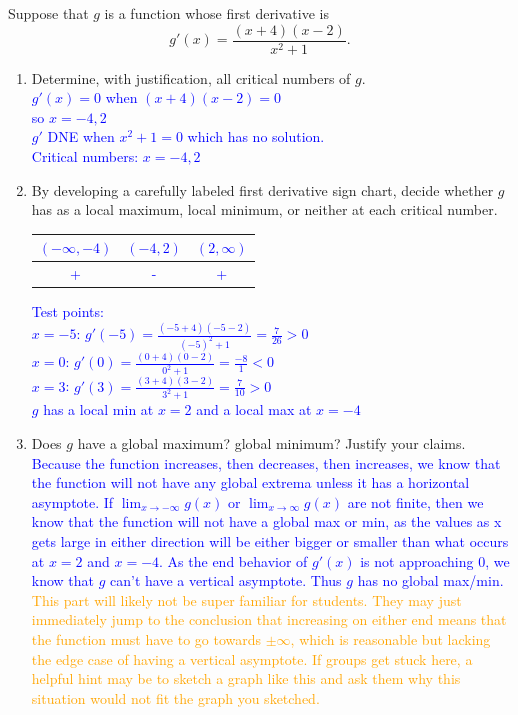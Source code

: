 \documentclass{ximera}
\begin{document}
\begin{exercise}
    Suppose that $g$ is a function whose first derivative is \[g'(x)=\frac{(x+4)(x-2)}{x^2+1}.\]
    \begin{enumerate}
        \item Determine, with justification, all critical numbers of $g$.\\
        \textcolor{blue}{$g'(x)=0$ when $(x+4)(x-2)=0$\\
        so $x=-4, 2$\\
        $g'$ DNE when $x^2+1=0$ which has no solution.\\
        Critical numbers: $x=-4,2$}
        \item  By developing a carefully labeled first derivative sign chart, decide whether $g$ has as a local maximum, local minimum, or neither at each critical number.\\
        \textcolor{blue}{
            \begin{tabular}{c|c|c}
                $(-\infty,-4)$ & $(-4,2)$ & $(2,\infty)$\\
                \hline
                + & - & +\\
            \end{tabular}
        Test points: \\
        $x=-5$: $g'(-5)=\frac{(-5+4)(-5-2)}{(-5)^2+1}=\frac{7}{26}>0$\\
        $x=0$: $g'(0)=\frac{(0+4)(0-2)}{0^2+1}=\frac{-8}{1}<0$\\
        $x=3$: $g'(3)=\frac{(3+4)(3-2)}{3^2+1}=\frac{7}{10}>0$\\
        $g$ has a local min at $x=2$ and a local max at $x=-4$}
        \item Does $g$ have a global maximum? global minimum? Justify your claims.\\
        \textcolor{blue}{Because the function increases, then decreases, then increases, we know that the function will not have any global extrema unless it has a horizontal asymptote. If $\lim_{x\rightarrow -\infty}g(x)$ or $\lim_{x\rightarrow \infty}g(x)$ are not finite, then we know that the function will not have a global max or min, as the values as x gets large in either direction will be either bigger or smaller than what occurs at $x=2$ and $x=-4$. As the end behavior of $g'(x)$ is not approaching 0, we know that $g$ can't have a vertical asymptote.  Thus $g$ has no global max/min. }\\
        \textcolor{orange}{This part will likely not be super familiar for students.  They may just immediately jump to the conclusion that increasing on either end means that the function must have to go towards $\pm \infty$, which is reasonable but lacking the edge case of having a vertical asymptote.  If groups get stuck here, a helpful hint may be to sketch a graph like this and ask them why this situation would not fit the graph you sketched.}

\end{enumerate}
\end{exercise}
\end{document}
